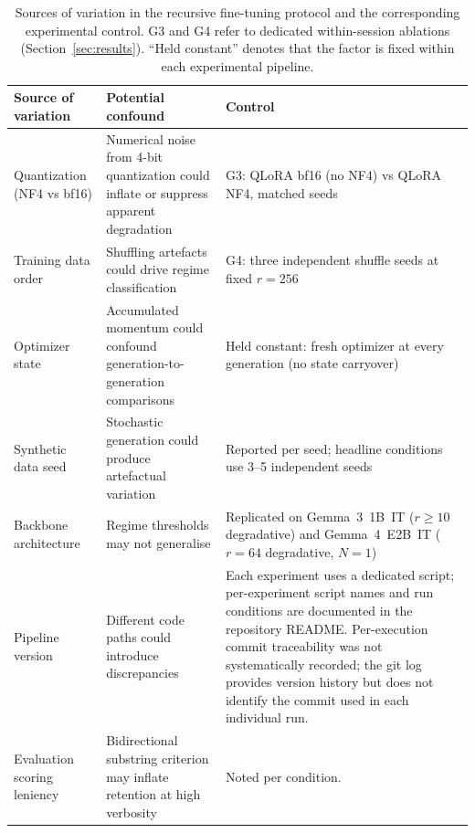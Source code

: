 \documentclass[a4paper,fleqn]{cas-dc}
\newif\ifshowchanges
\newcommand{\rev}[1]{\ifshowchanges{\color{blue}#1}\else{#1}\fi}
\begin{document}
\begin{table}[tp]
\caption{\rev{Sources of variation in the recursive fine-tuning
protocol and the corresponding experimental control. G3 and G4 refer to
dedicated within-session ablations (Section~\ref{sec:results}). ``Held
constant'' denotes that the factor is \rev{fixed within each experimental pipeline}.}}
\label{tab:controls}
\small
\setlength{\tabcolsep}{4pt}
\begin{tabularx}{\textwidth}{@{}
    >{\raggedright\arraybackslash}p{}
    >{\raggedright\arraybackslash}p{}
    X
@{}}
\toprule
\textbf{Source of variation} &
\textbf{Potential confound} &
\textbf{Control} \\
\midrule

Quantization (NF4 vs bf16) &
Numerical noise from 4-bit quantization could inflate or suppress apparent degradation &
G3: QLoRA bf16 (no NF4) vs QLoRA NF4, matched seeds \\

\addlinespace

Training data order &
Shuffling artefacts could drive regime classification &
G4: three independent shuffle seeds at fixed $r=256$ \\

\addlinespace

Optimizer state &
Accumulated momentum could confound generation-to-generation comparisons &
Held constant: fresh optimizer at every generation (no state carryover) \\

\addlinespace

Synthetic data seed &
Stochastic generation could produce artefactual variation &
Reported per seed; headline conditions use 3--5 independent seeds \\

\addlinespace

Backbone architecture &
Regime thresholds may not generalise &
Replicated on Gemma~3~1B~IT ($r\geq10$ degradative) and Gemma~4~E2B~IT ($r=64$ degradative, $N=1$) \\

\addlinespace

Pipeline version &
Different code paths could introduce discrepancies &
\rev{Each experiment uses a dedicated script; per-experiment script names and run conditions are documented in the repository README. \rev{Per-execution commit traceability was not systematically recorded; the git log provides version history but does not identify the commit used in each individual run.}} \\

\addlinespace

Evaluation scoring leniency &
Bidirectional substring criterion may inflate retention at high verbosity &
Noted per condition. \\

\bottomrule
\end{tabularx}
\end{table}
\end{document}
